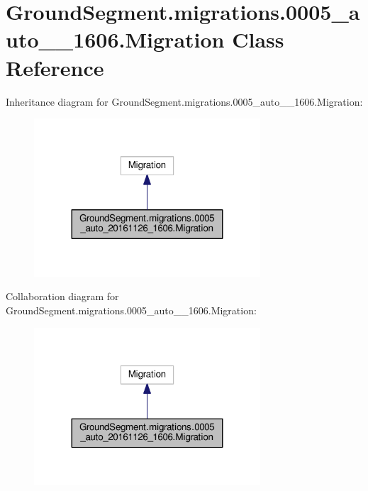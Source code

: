 \hypertarget{class_ground_segment_1_1migrations_1_10005__auto__20161126__1606_1_1_migration}{}\section{Ground\+Segment.\+migrations.0005\+\_\+auto\+\_\+\_\+1606.Migration Class Reference}
\label{class_ground_segment_1_1migrations_1_10005__auto__20161126__1606_1_1_migration}


Inheritance diagram for Ground\+Segment.\+migrations.0005\+\_\+auto\+\_\+\_\+1606.Migration\+:\nopagebreak
\begin{figure}[H]
\begin{center}
\leavevmode
\includegraphics[width=239pt]{class_ground_segment_1_1migrations_1_10005__auto__20161126__1606_1_1_migration__inherit__graph}
\end{center}
\end{figure}


Collaboration diagram for Ground\+Segment.\+migrations.0005\+\_\+auto\+\_\+\_\+1606.Migration\+:\nopagebreak
\begin{figure}[H]
\begin{center}
\leavevmode
\includegraphics[width=239pt]{class_ground_segment_1_1migrations_1_10005__auto__20161126__1606_1_1_migration__coll__graph}
\end{center}
\end{figure}
